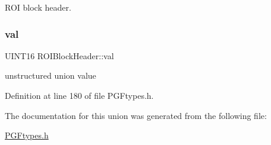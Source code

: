 R\+OI block header. 

\mbox{\label{unionROIBlockHeader_a84e2058de6eb0cb75f6d5b0388915494}} 
\subsubsection{\texorpdfstring{val}{val}}
{\footnotesize\ttfamily U\+I\+N\+T16 R\+O\+I\+Block\+Header\+::val}

unstructured union value 

Definition at line 180 of file P\+G\+Ftypes.\+h.



The documentation for this union was generated from the following file\+:\begin{DoxyCompactItemize}
\item 
\mbox{\hyperlink{PGFtypes_8h}{P\+G\+Ftypes.\+h}}\end{DoxyCompactItemize}
